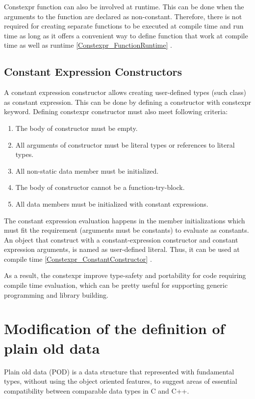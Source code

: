 \documentclass[11pt]{report}
\begin{document}
Constexpr function can also be involved at runtime. This can be done when the arguments to the function are declared as non-constant. Therefore, there is not required for creating separate functions to be executed at compile time and run time as long as it offers a convenient way to define function that work at compile time as well as runtime \ref{Constexpr_FunctionRuntime} \cite{Allain:2011:FutureCpp}.

\subsection{Constant Expression Constructors}
\label{subsection: Constant Expression Constructors}
A constant expression constructor allows creating user-defined types (such class) as constant expression. This can be done by defining a constructor with constexpr keyword. Defining constexpr constructor must also meet following criteria:

\begin{enumerate}
\item	The body of constructor must be empty.
\item	All arguments of constructor must be literal types or references to literal types.
\item   All non-static data member must be initialized.
\item	The body of constructor cannot be a function-try-block.
\item	All data members must be initialized with constant expressions.
\end{enumerate}

The constant expression evaluation happens in the member initializations which must fit the requirement (arguments must be constants) to evaluate as constants. An object that construct with a constant-expression constructor and constant expression arguments, is named as user-defined literal. Thus, it can be used at compile time \ref{Constexpr_ConstantConstructor} \cite{Gregorie:professionalcpp}.


As a result, the constexpr improve type-safety and portability for code requiring compile time evaluation, which can be pretty useful for supporting generic programming and library building.

\section{Modification of the definition of plain old data}
\label{section: Modification of the definition of plain old data}
Plain old data (POD) is a data structure that represented with fundamental types, without using the object oriented features, to suggest areas of essential compatibility between comparable data types in C and C++.
\end{document}
